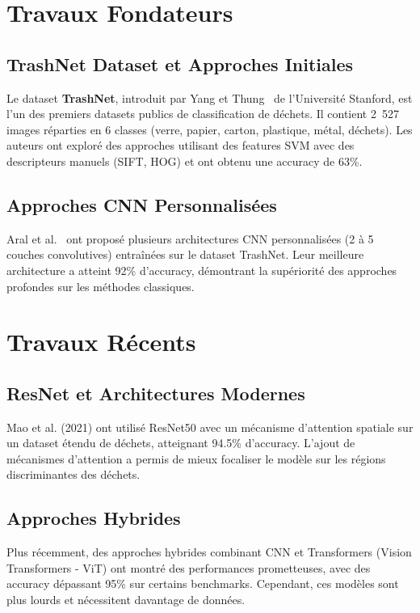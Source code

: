 \documentclass[12pt,a4paper]{report}
\begin{document}
\section{Travaux Fondateurs}

\subsection{TrashNet Dataset et Approches Initiales}
Le dataset \textbf{TrashNet}, introduit par Yang et Thung~\cite{yang2016} de l'Université Stanford, est l'un des premiers datasets publics de classification de déchets. Il contient 2~527 images réparties en 6 classes (verre, papier, carton, plastique, métal, déchets). Les auteurs ont exploré des approches utilisant des features SVM avec des descripteurs manuels (SIFT, HOG) et ont obtenu une accuracy de 63\%.

\subsection{Approches CNN Personnalisées}
Aral et al.~\cite{aral2018} ont proposé plusieurs architectures CNN personnalisées (2 à 5 couches convolutives) entraînées sur le dataset TrashNet. Leur meilleure architecture a atteint 92\% d'accuracy, démontrant la supériorité des approches profondes sur les méthodes classiques.

\section{Travaux Récents}

\subsection{ResNet et Architectures Modernes}
Mao et al. (2021) ont utilisé ResNet50 avec un mécanisme d'attention spatiale sur un dataset étendu de déchets, atteignant 94.5\% d'accuracy. L'ajout de mécanismes d'attention a permis de mieux focaliser le modèle sur les régions discriminantes des déchets.

\subsection{Approches Hybrides}
Plus récemment, des approches hybrides combinant CNN et Transformers (Vision Transformers - ViT) ont montré des performances prometteuses, avec des accuracy dépassant 95\% sur certains benchmarks. Cependant, ces modèles sont plus lourds et nécessitent davantage de données.
\end{document}
